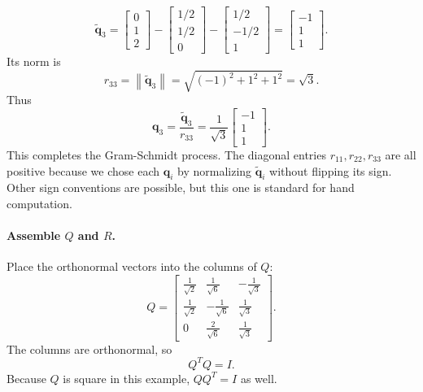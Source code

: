 \[
    \widetilde{\mathbf{q}}_3
    =
    \begin{bmatrix}
        0\\1\\2
    \end{bmatrix}
    -
    \begin{bmatrix}
        1/2\\1/2\\0
    \end{bmatrix}
    -
    \begin{bmatrix}
        1/2\\-1/2\\1
    \end{bmatrix}
    =
    \begin{bmatrix}
        -1\\1\\1
    \end{bmatrix}.
\]
Its norm is
\[
    r_{33}
    =\left\|\widetilde{\mathbf{q}}_3\right\|
    =\sqrt{(-1)^2+1^2+1^2}
    =\sqrt{3}.
\]
Thus
\[
    \mathbf{q}_3
    =\frac{\widetilde{\mathbf{q}}_3}{r_{33}}
    =\frac{1}{\sqrt{3}}
    \begin{bmatrix}
        -1\\1\\1
    \end{bmatrix}.
\]
This completes the Gram-Schmidt process. The diagonal entries \(r_{11}, r_{22}, r_{33}\) are all positive because we chose each \(\mathbf{q}_i\) by normalizing \(\widetilde{\mathbf{q}}_i\) without flipping its sign. Other sign conventions are possible, but this one is standard for hand computation.

\paragraph{Assemble \(Q\) and \(R\).}

Place the orthonormal vectors into the columns of \(Q\):
\[
    Q=
    \begin{bmatrix}
        \frac{1}{\sqrt{2}} & \frac{1}{\sqrt{6}} & -\frac{1}{\sqrt{3}}\\[4pt]
        \frac{1}{\sqrt{2}} & -\frac{1}{\sqrt{6}} & \frac{1}{\sqrt{3}}\\[4pt]
        0 & \frac{2}{\sqrt{6}} & \frac{1}{\sqrt{3}}
    \end{bmatrix}.
\]
The columns are orthonormal, so
\[
    Q^TQ=I.
\]
Because \(Q\) is square in this example, \(QQ^T=I\) as well.

